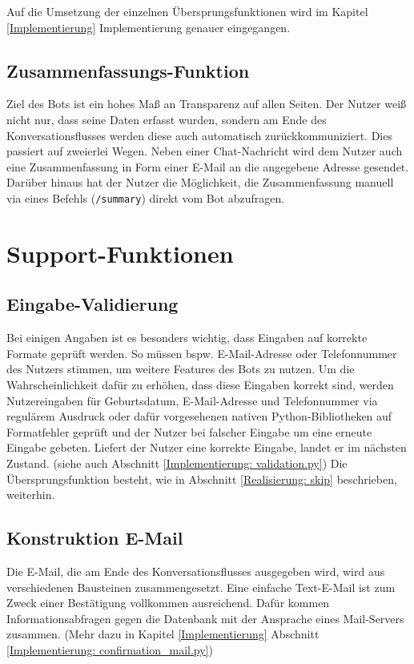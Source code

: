             Auf die Umsetzung der einzelnen Übersprungsfunktionen wird im Kapitel \ref{Implementierung} Implementierung genauer eingegangen.
    
        \subsection{Zusammenfassungs-Funktion}
            Ziel des Bots ist ein hohes Maß an Transparenz auf allen Seiten. Der Nutzer weiß nicht nur, dass seine Daten erfasst wurden, sondern am Ende des Konversationsflusses werden diese auch automatisch zurückkommuniziert. Dies passiert auf zweierlei Wegen. Neben einer Chat-Nachricht wird dem Nutzer auch eine Zusammenfassung in Form einer E-Mail an die angegebene Adresse gesendet. Darüber hinaus hat der Nutzer die Möglichkeit, die Zusammenfassung manuell via eines Befehls (\verb|/summary|) direkt vom Bot abzufragen.


    \section{Support-Funktionen}
        
        \subsection{Eingabe-Validierung} \label{Realisierung: Validation}
            Bei einigen Angaben ist es besonders wichtig, dass Eingaben auf korrekte Formate geprüft werden. So müssen bspw. E-Mail-Adresse oder Telefonnummer des Nutzers stimmen, um weitere Features des Bots zu nutzen. Um die Wahrscheinlichkeit dafür zu erhöhen, dass diese Eingaben korrekt sind, werden Nutzereingaben für Geburtsdatum, E-Mail-Adresse und Telefonnummer via regulärem Ausdruck oder dafür vorgesehenen nativen Python-Bibliotheken auf Formatfehler geprüft und der Nutzer bei falscher Eingabe um eine erneute Eingabe gebeten. Liefert der Nutzer eine korrekte Eingabe, landet er im nächsten Zustand. (siehe auch Abschnitt \ref*{Implementierung: validation.py}) Die Übersprungsfunktion besteht, wie in Abschnitt \ref*{Realisierung: skip} beschrieben, weiterhin.
        
        \subsection{Konstruktion E-Mail} \label{Realisierung: email}
            Die E-Mail, die am Ende des Konversationsflusses ausgegeben wird, wird aus verschiedenen Bausteinen zusammengesetzt. Eine einfache Text-E-Mail ist zum Zweck einer Bestätigung vollkommen ausreichend. Dafür kommen Informationsabfragen gegen die Datenbank mit der Ansprache eines Mail-Servers zusammen. (Mehr dazu in Kapitel \ref*{Implementierung} Abschnitt \ref*{Implementierung: confirmation_mail.py})
        
